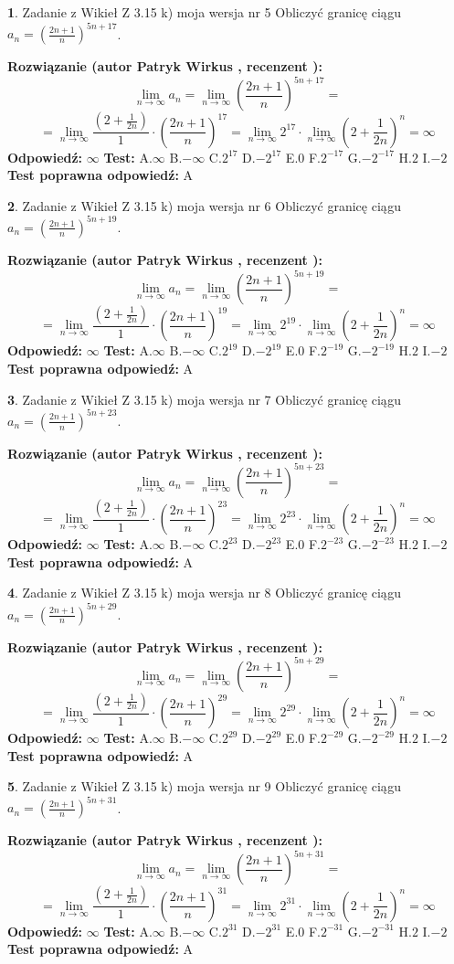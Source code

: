 \documentclass[12pt, a4paper]{article}
\theoremstyle{definition} %
\newtheorem{zad}{}
\newcommand{\zadStart}[1]{\begin{zad}#1\newline}
\newcommand{\zadStop}{\end{zad}}
\newcommand{\rozwStart}[2]{\noindent \textbf{Rozwiązanie (autor #1 , recenzent #2): }\newline}
\newcommand{\rozwStop}{\newline}
\newcommand{\odpStart}{\noindent \textbf{Odpowiedź:}\newline}
\newcommand{\odpStop}{\newline}
\newcommand{\testStart}{\noindent \textbf{Test:}\newline}
\newcommand{\testStop}{\newline}
\newcommand{\kluczStart}{\noindent \textbf{Test poprawna odpowiedź:}\newline}
\newcommand{\kluczStop}{\newline}
\begin{document}
\zadStart{Zadanie z Wikieł Z 3.15 k) moja wersja nr 5}
Obliczyć granicę ciągu $a_{n}=(\frac{2n+1}{n})^{5n+17}$.
\zadStop
\rozwStart{Patryk Wirkus}{}
$$\lim\limits_{n\to\infty} a_{n} = \lim\limits_{n\to\infty}(\frac{2n+1}{n})^{5n+17}=$$
$$=\lim\limits_{n\to\infty}\frac{(2+\frac{1}{2n})}{1} \cdot (\frac{2n+1}{n})^{17} = \lim\limits_{n\to\infty} 2^{17} \cdot \lim\limits_{n\to\infty} (2+\frac{1}{2n})^{n} = \infty$$
\rozwStop
\odpStart
$\infty$
\odpStop
\testStart
A.$\infty$
B.$-\infty$
C.$2^{17}$
D.$-2^{17}$
E.$0$
F.$2^{-17}$
G.$-2^{-17}$
H.$2$
I.$-2$
\testStop
\kluczStart
A
\kluczStop



\zadStart{Zadanie z Wikieł Z 3.15 k) moja wersja nr 6}
Obliczyć granicę ciągu $a_{n}=(\frac{2n+1}{n})^{5n+19}$.
\zadStop
\rozwStart{Patryk Wirkus}{}
$$\lim\limits_{n\to\infty} a_{n} = \lim\limits_{n\to\infty}(\frac{2n+1}{n})^{5n+19}=$$
$$=\lim\limits_{n\to\infty}\frac{(2+\frac{1}{2n})}{1} \cdot (\frac{2n+1}{n})^{19} = \lim\limits_{n\to\infty} 2^{19} \cdot \lim\limits_{n\to\infty} (2+\frac{1}{2n})^{n} = \infty$$
\rozwStop
\odpStart
$\infty$
\odpStop
\testStart
A.$\infty$
B.$-\infty$
C.$2^{19}$
D.$-2^{19}$
E.$0$
F.$2^{-19}$
G.$-2^{-19}$
H.$2$
I.$-2$
\testStop
\kluczStart
A
\kluczStop



\zadStart{Zadanie z Wikieł Z 3.15 k) moja wersja nr 7}
Obliczyć granicę ciągu $a_{n}=(\frac{2n+1}{n})^{5n+23}$.
\zadStop
\rozwStart{Patryk Wirkus}{}
$$\lim\limits_{n\to\infty} a_{n} = \lim\limits_{n\to\infty}(\frac{2n+1}{n})^{5n+23}=$$
$$=\lim\limits_{n\to\infty}\frac{(2+\frac{1}{2n})}{1} \cdot (\frac{2n+1}{n})^{23} = \lim\limits_{n\to\infty} 2^{23} \cdot \lim\limits_{n\to\infty} (2+\frac{1}{2n})^{n} = \infty$$
\rozwStop
\odpStart
$\infty$
\odpStop
\testStart
A.$\infty$
B.$-\infty$
C.$2^{23}$
D.$-2^{23}$
E.$0$
F.$2^{-23}$
G.$-2^{-23}$
H.$2$
I.$-2$
\testStop
\kluczStart
A
\kluczStop



\zadStart{Zadanie z Wikieł Z 3.15 k) moja wersja nr 8}
Obliczyć granicę ciągu $a_{n}=(\frac{2n+1}{n})^{5n+29}$.
\zadStop
\rozwStart{Patryk Wirkus}{}
$$\lim\limits_{n\to\infty} a_{n} = \lim\limits_{n\to\infty}(\frac{2n+1}{n})^{5n+29}=$$
$$=\lim\limits_{n\to\infty}\frac{(2+\frac{1}{2n})}{1} \cdot (\frac{2n+1}{n})^{29} = \lim\limits_{n\to\infty} 2^{29} \cdot \lim\limits_{n\to\infty} (2+\frac{1}{2n})^{n} = \infty$$
\rozwStop
\odpStart
$\infty$
\odpStop
\testStart
A.$\infty$
B.$-\infty$
C.$2^{29}$
D.$-2^{29}$
E.$0$
F.$2^{-29}$
G.$-2^{-29}$
H.$2$
I.$-2$
\testStop
\kluczStart
A
\kluczStop



\zadStart{Zadanie z Wikieł Z 3.15 k) moja wersja nr 9}
Obliczyć granicę ciągu $a_{n}=(\frac{2n+1}{n})^{5n+31}$.
\zadStop
\rozwStart{Patryk Wirkus}{}
$$\lim\limits_{n\to\infty} a_{n} = \lim\limits_{n\to\infty}(\frac{2n+1}{n})^{5n+31}=$$
$$=\lim\limits_{n\to\infty}\frac{(2+\frac{1}{2n})}{1} \cdot (\frac{2n+1}{n})^{31} = \lim\limits_{n\to\infty} 2^{31} \cdot \lim\limits_{n\to\infty} (2+\frac{1}{2n})^{n} = \infty$$
\rozwStop
\odpStart
$\infty$
\odpStop
\testStart
A.$\infty$
B.$-\infty$
C.$2^{31}$
D.$-2^{31}$
E.$0$
F.$2^{-31}$
G.$-2^{-31}$
H.$2$
I.$-2$
\testStop
\kluczStart
A
\kluczStop
\end{document}
